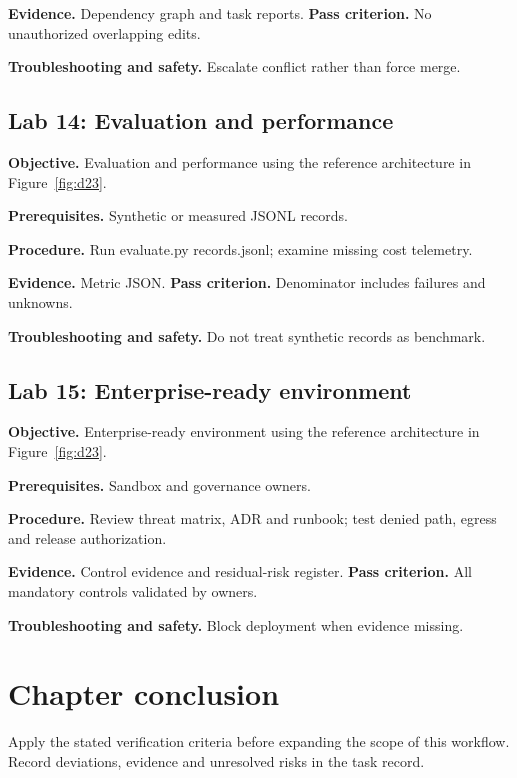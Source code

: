 \textbf{Evidence.} Dependency graph and task reports. \textbf{Pass criterion.} No unauthorized overlapping edits.

\textbf{Troubleshooting and safety.} Escalate conflict rather than force merge.

\subsection{Lab 14: Evaluation and performance}

\textbf{Objective.} Evaluation and performance using the reference architecture in Figure~\ref{fig:d23}.

\textbf{Prerequisites.} Synthetic or measured JSONL records.

\textbf{Procedure.} Run evaluate.py records.jsonl; examine missing cost telemetry.

\textbf{Evidence.} Metric JSON. \textbf{Pass criterion.} Denominator includes failures and unknowns.

\textbf{Troubleshooting and safety.} Do not treat synthetic records as benchmark.

\subsection{Lab 15: Enterprise-ready environment}

\textbf{Objective.} Enterprise-ready environment using the reference architecture in Figure~\ref{fig:d23}.

\textbf{Prerequisites.} Sandbox and governance owners.

\textbf{Procedure.} Review threat matrix, ADR and runbook; test denied path, egress and release authorization.

\textbf{Evidence.} Control evidence and residual-risk register. \textbf{Pass criterion.} All mandatory controls validated by owners.

\textbf{Troubleshooting and safety.} Block deployment when evidence missing.

\section{Chapter conclusion}

Apply the stated verification criteria before expanding the scope of this workflow. Record deviations, evidence and unresolved risks in the task record.
